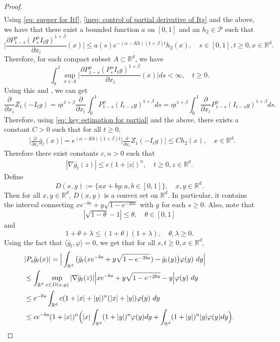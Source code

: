 \documentclass[12pt,a4paper]{amsart}
\theoremstyle{plain}
\theoremstyle{definition}
\numberwithin{equation}{section}
\begin{document}
\begin{proof}
\begin{align}
\end{align}
    Using \eqref{eq: supper for Itf}, \eqref{ineq: control of partial derivative of Itg} and the above, we have that there exist a bounded function $a$ on $[0,1]$ and an $h_2 \in \mathcal P$ such that
\begin{equation}
\label{eq: key estimation for partial}
    \Big|\frac{\partial P_{1-s}^\alpha  (P_s^\alpha I_t g)^{1+\beta}}{\partial x_i}  (x)\Big| \leq a(s) e^{-(\alpha - Kb)(1+\beta)t}h_2(x),\quad s\in [0,1],t\geq 0, x\in \mathbb R^d.
\end{equation}
    Therefore, for each compact subset $A \subset \mathbb R^d$, we have
\[
    \int_0^1 \sup_{x\in A} \Big|\frac{\partial P_{1-s}^\alpha  (P_s^\alpha I_t g)^{1+\beta}}{\partial x_i}  (x)\Big| ds < \infty,\quad t\geq 0.
\]
Using this and \cite[Theorem A.5.2]{Durrett2010Probability}, we can get
\[
    \frac{\partial}{\partial x_i} Z_1(-I_tg)
    = \eta i^{1+\beta}  \frac{\partial}{\partial x_i} \int_0^1 P_{1-s}^\alpha (I_{t-s}g)^{1+\beta} ds
    = \eta i^{1+\beta}  \int_0^1  \frac{\partial}{\partial x_i} P_{1-s}^\alpha (I_{t-s}g)^{1+\beta} ds.
\]
    Therefore, using \eqref{eq: key estimation for partial} and the above, there exists a constant $C> 0$ such that for all $t\geq 0$,
\begin{align}
    &\Big|\frac{\partial}{\partial x_i}\bar{g}_t(x)\Big|
    = e^{(\alpha-Kb)(1+\beta)t}\Big|\frac{\partial}{\partial x_i}Z_1(-I_tg)\Big| \leq C h_2(x),
    \quad x\in \mathbb R^d.
\end{align}
Therefore there exist constants $c,n>0$ such that
\begin{align}\label{ineq: control of sup gt}
    |\nabla \bar g_t (z)|
    \leq c(1+|z|)^n,
    \quad t\geq 0, z\in \mathbb R^d.
\end{align}
    Define
\[
    D(x,y):= \{ax+by: a,b\in [0,1]\},\quad x, y \in \mathbb R^d.
\]
    Then for all $x,y\in \mathbb R^d$, $D(x,y)$ is a convex set on $\mathbb R^d$.
    In particular, it contains the interval connecting $xe^{-bs}+y\sqrt{1-e^{-2bs}}$ with $y$ for each $s\geq 0$.
    Also, note that
\[
    |\sqrt {1-\theta} - 1| \leq \theta, \quad \theta\in [0,1]
\]
and
\[
    1+\theta + \lambda \leq (1+\theta)(1+\lambda), \quad \theta ,\lambda \geq 0.
\]
	Using the fact that $\langle \bar{g}_t,\varphi\rangle = 0$, 
    we get that for all $s,t\geq 0, x\in \mathbb R^d$,
\begin{align}
    &|P_s\bar{g}_t(x)|
    = \Big|\int_{\mathbb R^d} \big(\bar {g}_t(xe^{-bs}+y\sqrt{1-e^{-2bs}})-\bar {g}_t (y)\big) \varphi(y)~dy \Big| \\
    & \leq \int_{\mathbb R^d} \sup_{z\in D(x,y)} |\nabla \bar g_t (z)|\Big|xe^{-bs}+y\sqrt{1-e^{-2bs}}-y \Big| \varphi(y)~dy \\
    & \leq e^{-bs}\int_{\mathbb R^d} c(1+|x|+|y|)^n (|x|+|y|) \varphi(y)~dy
    \\& \leq ce^{-bs}(1+|x|)^n\Big(|x|\int_{\mathbb R^d} (1+|y|)^n\varphi(y)dy + \int_{\mathbb R^d}(1+|y|)^n|y|\varphi(y)dy\Big).
    \qedhere
\end{align}
\end{proof}
\end{document}
